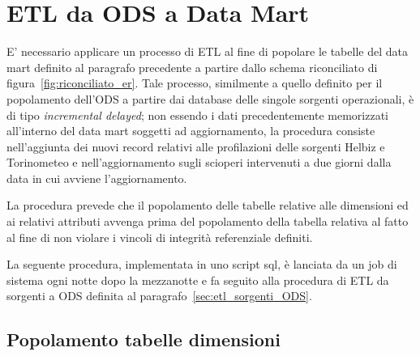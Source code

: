 \section{ETL da ODS a Data Mart}

E' necessario applicare un processo di ETL al fine di popolare le tabelle del
data mart definito al paragrafo precedente a partire dallo schema riconciliato
di figura~\ref{fig:riconciliato_er}. Tale processo, similmente a quello definito
per il popolamento dell'ODS a partire dai database delle singole sorgenti
operazionali, è di tipo \textit{incremental delayed}; non essendo i dati
precedentemente memorizzati all'interno del data mart soggetti ad aggiornamento,
la procedura consiste nell'aggiunta dei nuovi record relativi alle profilazioni
delle sorgenti Helbiz e Torinometeo e nell'aggiornamento sugli scioperi
intervenuti a due giorni dalla data in cui avviene l'aggiornamento.

La procedura prevede che il popolamento delle tabelle relative alle dimensioni
ed ai relativi attributi avvenga prima del popolamento della tabella relativa
al fatto al fine di non violare i vincoli di integrità referenziale definiti.

La seguente procedura, implementata in uno script sql, è lanciata da un job di
sistema ogni notte dopo la mezzanotte e fa seguito alla procedura di ETL
da sorgenti a ODS definita al paragrafo~\ref{sec:etl_sorgenti_ODS}.

\subsection{Popolamento tabelle dimensioni}

